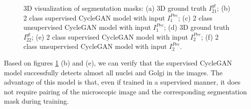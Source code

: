 \begin{figure}[!htb]
\hfil
{}\hfil
{} 

\caption{3D visualization of segmentation masks: (a) 3D ground truth $I^{gt}_{21}$; (b) 2 class supervised CycleGAN model with input $I^{Pre}_1$; (c) 2 class unsupervised CycleGAN model with input $I^{Pre}_1$; (d) 3D ground truth $I^{gt}_{22}$; (e) 2 class supervised CycleGAN model with input $I^{Pre}_2$; (f) 2 class unsupervised CycleGAN model with input $I^{Pre}_2$.}

\label{fig:results-cyclegan-2channel}

\end{figure}

Based on figures \ref{fig:results-cyclegan-2channel} (b) and (e), we can verify that the supervised CycleGAN model successfully detects almost all nuclei and Golgi in the images. The advantage of this model is that, even if trained in a supervised manner, it does not require pairing of the microscopic image and the corresponding segmentation mask during training. 

